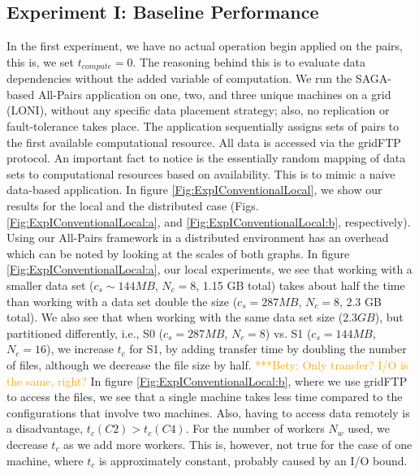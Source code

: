 \documentclass{rspublic}
\newcommand{\betynote}[1]{ {\textcolor{orange} { ***Bety: #1 }}}
\begin{document}
\subsection{Experiment I: Baseline Performance}
 In the first experiment, we have no actual operation begin applied on
the pairs, this is, we set $t_{compute}=0$. The reasoning behind this is to
evaluate data dependencies without the added variable of computation.
We run the SAGA-based All-Pairs application on one, two, and three
unique machines on a grid (LONI), without any specific data placement
strategy; also, no replication or fault-tolerance takes place. The
application sequentially assigns sets of pairs to the first available
computational resource. All data is accessed via the gridFTP protocol.
An important fact to notice is the essentially random mapping of data
sets to computational resources based on availability. This is to mimic
a naive data-based application. In figure
\ref{Fig:ExpIConventionalLocal}, we show our results for the local and the 
distributed case (Figs. \ref{Fig:ExpIConventionalLocal:a}, and
\ref{Fig:ExpIConventionalLocal:b}, respectively). Using our All-Pairs framework
in a distributed environment has an overhead which can be noted by looking at
the scales of both graphs. In figure
\ref{Fig:ExpIConventionalLocal:a}, our local experiments, we see that working with a smaller data set ($c_s \sim 144MB$, $N_c = 8$, 1.15 GB total) takes about half the time than working with a data set double the size ($c_s = 287MB$, $N_c = 8$, 2.3 GB total). We also see that when working with the same data set size ($2.3 GB$), but partitioned differently, i.e., S0 ($c_s = 287MB$, $N_c = 8$) vs. S1 ($c_s = 144MB$, $N_c = 16$), we increase $t_c$ for S1, by adding transfer time by doubling the number of files, although we decrease the file size by half. \betynote{Only transfer? I/O is the same, right?}In figure \ref{Fig:ExpIConventionalLocal:b}, where we use gridFTP 
to access the files, we see that a single 
machine takes less time compared to the configurations that
involve two machines. Also, having to access data remotely is a
disadvantage, $t_c(C2) > t_c(C4)$. For the number of workers $N_w$ used, we
decrease $t_c$ as we add more workers. This is, however, not true for the case
of one machine, where $t_c$ is approximately constant, probably caused by an
I/O bound.
\end{document}
